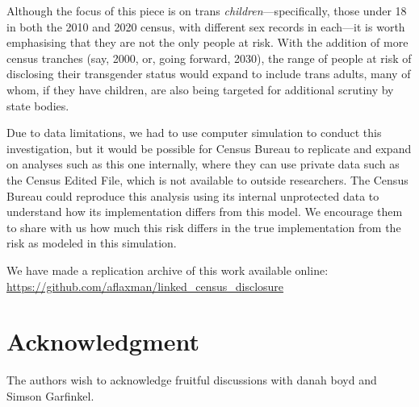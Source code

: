 \documentclass{jpc} %
\theoremstyle{plain}\newtheorem{satz}[thm]{Satz} %
\begin{document}
Although the focus of this piece is on trans \textit{children}---specifically, those under 18 in both the 2010 and 2020 census, with different sex records in each---it is worth emphasising that they are not the only people at risk. With the addition of more census tranches (say, 2000, or, going forward, 2030), the range of people at risk of disclosing their transgender status would expand to include trans adults, many of whom, if they have children, are also being targeted for additional scrutiny by state bodies.


Due to data limitations, we had to use computer simulation to conduct this investigation, but it would be possible for Census Bureau to replicate and expand on analyses such as this one internally, where they can use private data such as the Census Edited File, which is not available to outside researchers.  The Census Bureau could reproduce this analysis using its internal unprotected data to understand how its implementation differs from this model. We encourage them to share with us how much this risk differs in the true implementation from the risk as modeled in this simulation.

We have made a replication archive of this work available online: \url{https://github.com/aflaxman/linked_census_disclosure}
 
\section*{Acknowledgment}
  \noindent The authors wish to acknowledge fruitful discussions with danah boyd and Simson Garfinkel.%




\end{document}
